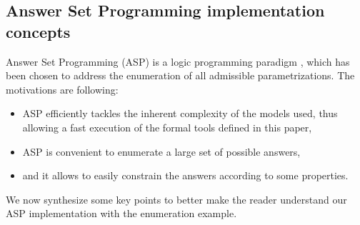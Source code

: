 \subsection{Answer Set Programming implementation concepts}


\newcommand{\ti}[1]{\texttt{\textit{#1}}}
\newcommand{\aspil}[1]{\texttt{#1}}
\newcommand{\asp}[1]{\begin{itemize} \item[] \aspil{#1} \end{itemize}}

\newcommand{\atom}[1]{#1}
\newcommand{\predicate}[1]{#1}
\newcommand{\la}{\leftarrow}
\newcommand{\var}[1]{#1}
\newcommand{\nota}{\neg}

\newcommand{\paramlabel}{\predicate{param\_label}}
\newcommand{\paramres}{\predicate{param\_resource}}
\newcommand{\component}{\predicate{component}}
\newcommand{\componentlevels}{\predicate{component\_levels}}
\newcommand{\param}{\predicate{param}}
\newcommand{\inferedparam}{\predicate{infered\_param}}
\newcommand{\lessactive}{\predicate{less\_active}}
\newcommand{\paraminf}{\predicate{param\_inf}}



Answer Set Programming (ASP) is a logic programming paradigm \cite{Baral03},
which has been chosen to address the enumeration of all admissible parametrizations.
The motivations are following:
\begin{itemize}
  \item ASP efficiently tackles the inherent complexity of the models used, thus allowing a fast execution of the formal tools defined in this paper,
  \item ASP is convenient to enumerate a large set of possible answers,
  \item and it allows to easily constrain the answers according to some properties.
\end{itemize}
We now synthesize some key points to better make the reader understand our ASP implementation with the enumeration example.

